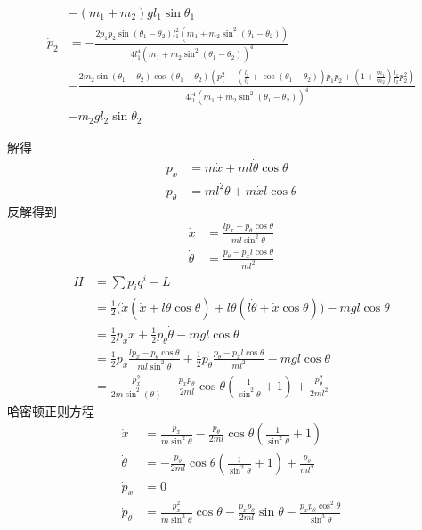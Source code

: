 \begin{solution}
\begin{align*}
        &-(m_1+m_2)gl_1\sin\theta_1\\
        \dot p_2&=-\frac{2p_1p_2\sin(\theta_1-\theta_2)l_1^2(m_1+m_2\sin^2(\theta_1-\theta_2))}{4l_1^4(m_1+m_2\sin^2(\theta_1-\theta_2))^4}\\
        &-\frac{2m_2\sin(\theta_1-\theta_2)\cos(\theta_1-\theta_2)(p_1^2-(\frac{l_1}{l_2}+\cos(\theta_1-\theta_2))p_1p_2+(1+\frac{m_1}{m_2})\frac{l_1}{l_2}p_2^2)}{4l_1^4(m_1+m_2\sin^2(\theta_1-\theta_2))^4}\\
        &-m_2gl_2\sin\theta_2
    \end{align*}
\end{solution}
\begin{solution}
    解得
    \begin{align*}
        p_x&=m\dot x+ml\dot\theta\cos\theta\\
        p_\theta&=ml^2\dot \theta+m\dot xl\cos\theta
    \end{align*}
    反解得到
    \begin{align*}
        \dot x&=\frac{lp_x-p_\theta\cos\theta}{ml\sin^2\theta}\\
        \dot \theta&=\frac{p_\theta-p_xl\cos\theta}{ml^2}
    \end{align*}
    \begin{align*}
        H&=\sum p_iq^i-L\\
         &=\frac12\Big(\dot x(\dot x+l\dot\theta\cos\theta)+l\dot\theta(l\dot\theta+\dot x\cos\theta)\Big)-mgl\cos\theta\\
         &=\frac12p_x\dot x+\frac12p_\theta\dot\theta-mgl\cos\theta\\
         &=\frac12p_x\frac{lp_x-p_\theta\cos\theta}{ml\sin^2\theta}+\frac12p_\theta\frac{p_\theta-p_xl\cos\theta}{ml^2}-mgl\cos\theta\\
         &=\frac{p_x^2}{2m\sin^2(\theta)}-\frac{p_xp_\theta}{2ml}\cos\theta(\frac{1}{\sin^2\theta}+1)+\frac{p_\theta^2}{2ml^2}
    \end{align*}
    哈密顿正则方程
    \begin{align*}
        \dot x&=\frac{p_x}{m\sin^2\theta}-\frac{p_\theta}{2ml}\cos\theta(\frac{1}{\sin^2\theta}+1)\\
        \dot\theta&=-\frac{p_\theta}{2ml}\cos\theta(\frac{1}{\sin^2\theta}+1)+\frac{p_\theta}{ml^2}\\
        \dot p_x&=0\\
        \dot p_\theta&=\frac{p_x^2}{m\sin^3\theta}\cos\theta-\frac{p_xp_\theta}{2ml}\sin\theta-\frac{p_xp_\theta\cos^2\theta}{\sin^3\theta}
    \end{align*}
\end{solution}
